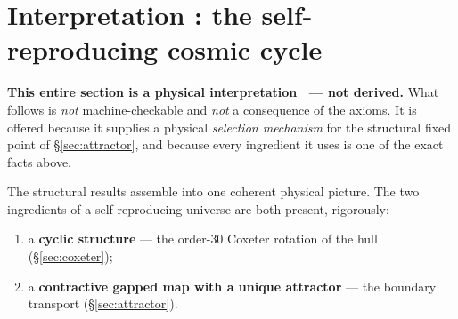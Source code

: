 \documentclass[11pt,a4paper]{article}
\begin{document}
\section{Interpretation \mC: the self-reproducing cosmic cycle}\label{sec:cycle}
\par\smallskip\noindent\textbf{This entire section is a physical interpretation \mC\ --- not derived.}
What follows is \emph{not} machine-checkable and \emph{not} a consequence of the axioms. It is offered
because it supplies a physical \emph{selection mechanism} for the structural fixed point of
\S\ref{sec:attractor}, and because every ingredient it uses is one of the exact facts above.
\par\smallskip

\noindent The structural results assemble into one coherent physical picture. The two ingredients of a
self-reproducing universe are both present, rigorously:
\begin{enumerate}[leftmargin=1.6em]
\item a \textbf{cyclic structure} --- the order-$30$ Coxeter rotation of the hull (\S\ref{sec:coxeter});
\item a \textbf{contractive gapped map with a unique attractor} --- the boundary transport (\S\ref{sec:attractor}).
\end{enumerate}
\end{document}

